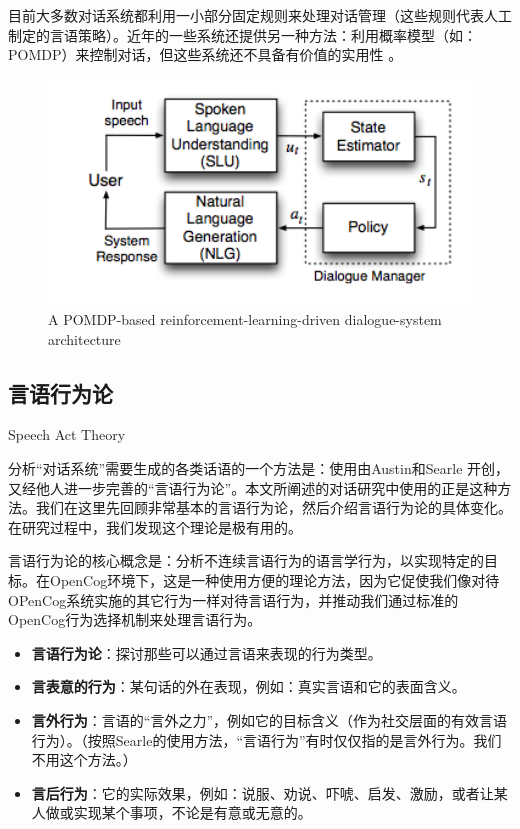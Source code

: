 目前大多数对话系统都利用一小部分固定规则来处理对话管理（这些规则代表人工制定的言语策略）。近年的一些系统还提供另一种方法：利用概率模型（如：POMDP）来控制对话，但这些系统还不具备有价值的实用性\cite{Young2006} \cite{Williams2010}。

\begin{figure}[htb]
\centering
\includegraphics[width=12cm]{figures/pomdp.png}
\caption{ A POMDP-based reinforcement-learning-driven dialogue-system architecture }
\label{fig:dialogue}
\end{figure}


\subsection{言语行为论}{Speech Act Theory}
\label{sec:speechAct}

分析“对话系统”需要生成的各类话语的一个方法是：使用由Austin\cite{Austin2005}和Searle\cite{Searle1969} 开创，又经他人进一步完善的“言语行为论”。本文所阐述的对话研究中使用的正是这种方法。我们在这里先回顾非常基本的言语行为论，然后介绍言语行为论的具体变化。在研究过程中，我们发现这个理论是极有用的。

言语行为论的核心概念是：分析不连续言语行为的语言学行为，以实现特定的目标。在OpenCog环境下，这是一种使用方便的理论方法，因为它促使我们像对待OPenCog系统实施的其它行为一样对待言语行为，并推动我们通过标准的OpenCog行为选择机制来处理言语行为。

\begin{itemize}
\item {\bf 言语行为论}：探讨那些可以通过言语来表现的行为类型。
\item {\bf 言表意的行为}：某句话的外在表现，例如：真实言语和它的表面含义。
\item {\bf 言外行为}：言语的“言外之力”，例如它的目标含义（作为社交层面的有效言语行为）。（按照Searle的使用方法，“言语行为”有时仅仅指的是言外行为。我们不用这个方法。）
\item {\bf 言后行为}：它的实际效果，例如：说服、劝说、吓唬、启发、激励，或者让某人做或实现某个事项，不论是有意或无意的。
\end{itemize}


